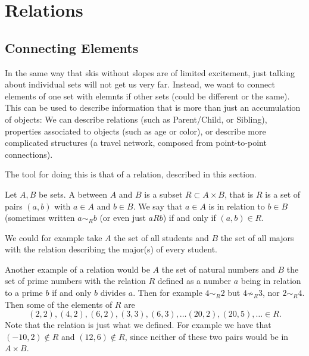 \chapter{Relations}
\label{chrels}

\section{Connecting Elements}

In the same way that skis without slopes are of limited excitement, just
talking about individual sets will not get us very far. Instead, we want to
connect elements of one set with elemnts if other sets (could be different
or the same). This can be used to describe information that is more than
just an accumulation of objects: We can describe relations (such as
Parent/Child, or Sibling), properties associated to objects (such as age
or color), or describe more complicated structures (a travel network,
composed from point-to-point connections).

The tool for doing this is that of a relation, described in this section.

\begin{defn}
Let $A,B$ be sets. A  between $A$ and $B$ is a subset
$R\subset A\times B$, that is $R$ is a set of pairs $(a,b)$ with $a\in A$
and $b\in B$. We say that $a\in A$ is in relation to $b\in B$ (sometimes
written $a\sim_R b$ (or even just $aRb$) if and only if $(a,b)\in R$.
\end{defn}

We could for example take $A$ the set of all students and $B$ the set of all
majors with the relation describing the major(s) of every
student.

Another example of a relation would be $A$ the set of natural numbers and
$B$ the set of prime numbers with the relation $R$ defined as a number $a$
being in relation to a prime $b$ if and only $b$ divides $a$. Then for
example $4\sim_R 2$ but $4\not\sim_R 3$, nor $2\sim_R 4$. Then some of the
elements of $R$ are
\[
(2,2), (4,2), (6,2), (3,3), (6,3), \ldots (20,2),(20,5),\ldots \in R.
\]
Note that the relation is just what we defined. For example we have that
$(-10,2)\not\in R$ and $(12,6)\not\in R$, since neither of these two pairs
would be in $A\times B$.
\smallskip

